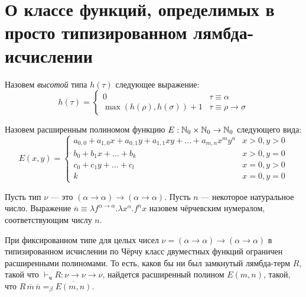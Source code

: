 \section{О классе функций, определимых в просто типизированном лямбда-исчислении}


\begin{definition}
Назовем \emph{высотой} типа $h(\tau)$ следующее выражение:
$$h(\tau) = \left\{\begin{array}{ll}0&\tau\equiv\alpha\\
\max(h(\rho),h(\sigma))+1 & \tau\equiv\rho\rightarrow\sigma\end{array}\right.$$
\end{definition}

\begin{definition}
Назовем расширенным полиномом функцию $E: \Bbb N_0\times \Bbb N_0 \rightarrow \Bbb N_0$ следующего вида:
$$E(x,y) = \left\{\begin{array}{ll}a_{0,0} + a_{1,0}x + a_{0,1}y + a_{1,1}xy + \dots + a_{m,n}x^my^n & x>0,y>0 \\
b_0 + b_1x + \dots + b_k & x > 0, y = 0 \\
c_0 + c_1y + \dots + c_l & x = 0, y > 0\\
k & x = 0, y = 0
\end{array}\right.$$
\end{definition}

\begin{definition}
Пусть тип $\nu$ --- это $(\alpha\rightarrow\alpha)\rightarrow(\alpha\rightarrow\alpha)$.
Пусть $n$ --- некоторое натуральное число.
Выражение $\overline{n} \equiv \lambda f^{\alpha\rightarrow\alpha} . \lambda x^\alpha. f^n x$ 
назовем чёрчевским нумералом, соответствующим числу $n$.
\end{definition}

\begin{theorem}
При фиксированном типе для целых чисел 
$\nu=(\alpha\rightarrow\alpha)\rightarrow(\alpha\rightarrow\alpha)$
в типизированном исчислении по Чёрчу класс двуместных функций ограничен 
расширенными полиномами. То есть, каков бы ни был замкнутый лямбда-терм $R$, 
такой что $\vdash_\texttt{ч} R: \nu \rightarrow \nu \rightarrow \nu$,
найдется расширенный полином $E(m,n)$, такой, что
$R \,\overline{m}\,\overline{n} =_\beta \overline{E(m,n)}$.
\end{theorem}

